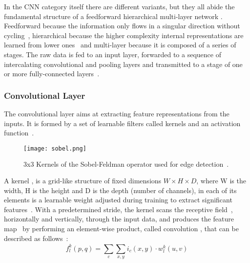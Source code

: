 \documentclass[class=report, crop=false, a4paper, 12pt]{standalone}
\begin{document}
\par In the CNN category itself there are different variants, but they all abide the fundamental structure of a feedforward hierarchical multi-layer network . Feedforward because the information only flows in a singular direction without cycling~\autocite{zellSimulationNeuronalerNetze1994}, hierarchical because the higher complexity internal representations are learned from lower ones~\autocite{lecunDeepLearning2015, zhuBCNNBranchConvolutional2017} and multi-layer because it is composed of a series of stages. The raw data is fed to an input layer, forwarded to a sequence of intercalating convolutional and pooling layers and transmitted to a stage of one or more fully-connected layers~\autocite{lecunDeepLearning2015, guRecentAdvancesConvolutional2018, alzubaidiReviewDeepLearning2021}.   

\subsubsection{Convolutional Layer}
\par The convolutional layer aims at extracting feature representations from the inputs. It is formed by a set of learnable filters called kernels and an activation function~\autocite{guRecentAdvancesConvolutional2018,yamashitaConvolutionalNeuralNetworks2018}. 

\begin{figure}[H]
    \centering
    \texttt{[image: sobel.png]}
    \caption[3x3 Kernels of the Sobel-Feldman operator used for edge detection.]{3x3 Kernels of the Sobel-Feldman operator used for edge detection~\autocite{sobelIsotropicGradientOperator1973}.}
    \label{fig:sobel}
\end{figure}

A kernel , is a grid-like structure of fixed dimensions $W\times H\times D$, where W is the width, H is the height and D is the depth (number of channels), in each of its elements is a learnable weight adjusted during training to extract significant features~\autocite{alzubaidiReviewDeepLearning2021}. With a predetermined stride, the kernel scans the receptive field~\autocite{khanSurveyRecentArchitectures2020}, horizontally and vertically, through the input data, and produces the feature map~\autocite{lecunDeepLearning2015, alzubaidiReviewDeepLearning2021} by performing an element-wise product, called convolution , that can be described as follows~\autocite{khanSurveyRecentArchitectures2020}:
\begin{equation}
    f_l^k(p, q) = \sum_{c}^{}\sum_{x, y}^{}i_c(x, y)\cdot w^k_l(u,v)
\end{equation}
\end{document}
